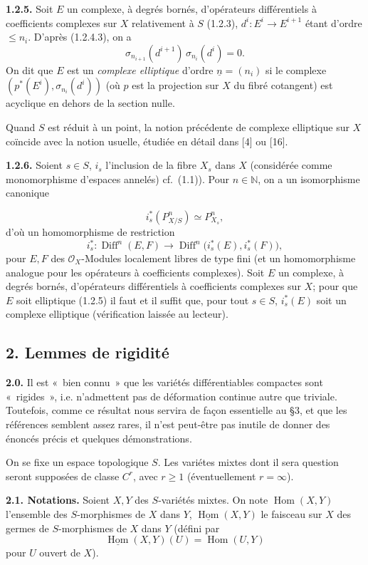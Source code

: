 \documentclass[11pt]{article}
\providecommand{\cO}{\mathcal O}\providecommand{\R}{\mathbb R}\providecommand{\N}{\mathbb N}
\providecommand{\Diff}{\operatorname{Diff}}\providecommand{\Homop}{\operatorname{Hom}}
\begin{document}
\textbf{1.2.5.} Soit $E$ un complexe, à degrés bornés, d'opérateurs différentiels à coefficients complexes sur $X$ relativement à $S$ (1.2.3), $d^i:E^i\longrightarrow E^{i+1}$ étant d'ordre $\le n_i$. D'après (1.2.4.3), on a
\[
  \sigma_{n_{i+1}}(d^{i+1})\,\sigma_{n_i}(d^i)=0.
\]
On dit que $E$ est un \emph{complexe elliptique} d'ordre $\underline{n}=(n_i)$ si le complexe $(p^*(E^i),\sigma_{n_i}(d^i))$ (où $p$ est la projection sur $X$ du fibré cotangent) est acyclique en dehors de la section nulle.

Quand $S$ est réduit à un point, la notion précédente de complexe elliptique sur $X$ coïncide avec la notion usuelle, étudiée en détail dans [4] ou [16].

\textbf{1.2.6.} Soient $s\in S$, $i_s$ l'inclusion de la fibre $X_s$ dans $X$ (considérée comme monomorphisme d'espaces annelés) cf.~(1.1)). Pour $n\in\N$, on a un isomorphisme canonique

\[
  i_s^*(P^n_{X/S})\simeq P^n_{X_s},
\]
d'où un
homomorphisme de restriction
\[
  i_s^*:\Diff^n(E,F)
  \longrightarrow
  \Diff^n\bigl(i_s^*(E),i_s^*(F)\bigr),
\]
pour $E,F$ des $\cO_X$-Modules localement libres de type fini (et un homomorphisme analogue pour les opérateurs à coefficients complexes). Soit $E$ un complexe, à degrés bornés, d'opérateurs différentiels à coefficients complexes sur $X$; pour que $E$ soit elliptique (1.2.5) il faut et il suffit que, pour tout $s\in S$, $i_s^*(E)$ soit un complexe elliptique (vérification laissée au lecteur).

\subsection*{2. Lemmes de rigidité}

\textbf{2.0.} Il est «~bien connu~» que les variétés différentiables compactes sont «~rigides~», i.e. n'admettent pas de déformation continue autre que triviale. Toutefois, comme ce résultat nous servira de façon essentielle au §3, et que les références semblent assez rares, il n'est peut-être pas inutile de donner des énoncés précis et quelques démonstrations.

On se fixe un espace topologique $S$. Les variétes mixtes dont il sera question seront supposées de classe $C^r$, avec $r\ge1$ (éventuellement $r=\infty$).

\textbf{2.1. Notations.} Soient $X,Y$ des $S$-variétés mixtes. On note $\Homop(X,Y)$ l'ensemble des $S$-morphismes de $X$ dans $Y$, $\underline{\Homop}(X,Y)$ le faisceau sur $X$ des germes de $S$-morphismes de $X$ dans $Y$ (défini par
\[
  \underline{\Homop}(X,Y)(U)=\Homop(U,Y)
\]
pour $U$ ouvert de $X$).
\end{document}
